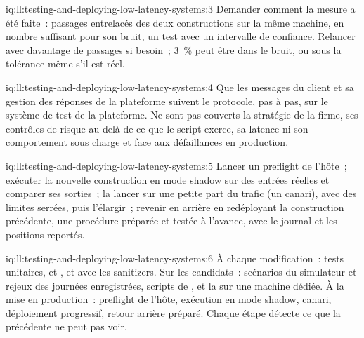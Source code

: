 \begin{solution}{iq:ll:testing-and-deploying-low-latency-systems:3}
Demander comment la mesure a été faite~: passages entrelacés des deux constructions sur la même machine, en nombre suffisant pour son bruit, un test avec un
intervalle de confiance. Relancer avec davantage de passages si besoin~; 3~\% peut être dans le bruit, ou sous la tolérance même s'il est réel.
\end{solution}

\begin{solution}{iq:ll:testing-and-deploying-low-latency-systems:4}
Que les messages du client et sa gestion des réponses de la plateforme suivent le protocole, pas à pas, sur le
système de test de la plateforme. Ne sont pas couverts la stratégie de la firme, ses contrôles de risque au-delà de ce que le script exerce, sa latence ni son comportement sous charge
et face aux défaillances en production.
\end{solution}

\begin{solution}{iq:ll:testing-and-deploying-low-latency-systems:5}
Lancer un preflight de l'hôte~; exécuter la nouvelle construction en mode shadow sur des entrées réelles et comparer ses sorties~; la lancer sur une petite part du trafic (un canari),
avec des limites serrées, puis l'élargir~; revenir en arrière en redéployant la construction précédente, une procédure préparée et testée à l'avance, avec le
journal et les positions reportés.
\end{solution}

\begin{solution}{iq:ll:testing-and-deploying-low-latency-systems:6}
À chaque modification~: tests unitaires,  et , et  avec les sanitizers. Sur les candidats~: scénarios du simulateur et
rejeux des journées enregistrées, scripts de , et la  sur une machine dédiée. À la mise en production~: preflight de l'hôte,
exécution en mode shadow, canari, déploiement progressif, retour arrière préparé. Chaque étape détecte ce que la précédente ne peut pas voir.
\end{solution}
